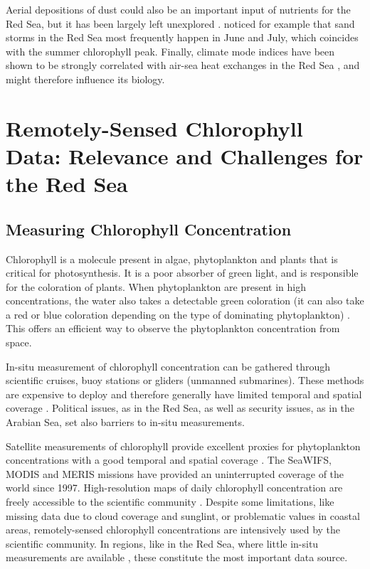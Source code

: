 Aerial depositions of dust could also be an important input of nutrients for
the Red Sea, but it has been largely left unexplored \citep{Triantafyllou2014}.
\citet{Raitsos2013} noticed for example that sand storms in the Red Sea most
frequently happen in June and July, which coincides with the summer chlorophyll
peak. Finally, climate mode indices have been shown to be strongly correlated
with air-sea heat exchanges in the Red Sea \citep{Abulnaja2015}, and might
therefore influence its biology.

\section{Remotely-Sensed Chlorophyll Data: Relevance and Challenges for the Red
Sea}

\subsection{Measuring Chlorophyll Concentration}

Chlorophyll is a molecule present in algae, phytoplankton and plants that is
critical for photosynthesis. It is a poor absorber of green light, and is
responsible for the coloration of plants. When phytoplankton are present in
high concentrations, the water also takes a detectable green coloration (it can
also take a red or blue coloration depending on the type of dominating
phytoplankton) \citep{Robinson2010}. This offers an efficient way to observe
the phytoplankton concentration from space.

In-situ measurement of chlorophyll concentration can be gathered through
scientific cruises, buoy stations or gliders (unmanned submarines). These
methods are expensive to deploy and therefore generally have limited temporal
and spatial coverage \citep{Robinson2010}. Political issues, as in the Red Sea,
as well as security issues, as in the Arabian Sea, set also barriers to in-situ
measurements.

Satellite measurements of chlorophyll provide excellent proxies for
phytoplankton concentrations with a good temporal and spatial coverage
\citep{Robinson2010}. The SeaWIFS, MODIS and MERIS missions have provided an
uninterrupted coverage of the world since 1997. High-resolution maps of daily
chlorophyll concentration are freely accessible to the scientific community
\citep{McClain2009}. Despite some limitations, like missing data due to cloud
coverage and sunglint, or problematic values in coastal areas, remotely-sensed
chlorophyll concentrations are intensively used by the scientific community. In
regions, like in the Red Sea, where little in-situ measurements are available
\citep{Raitsos2013, Brewin2013}, these constitute the most important data
source.

